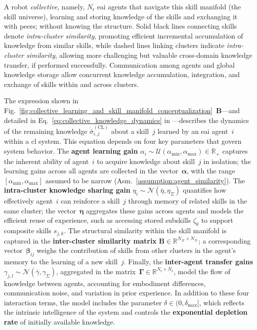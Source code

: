 \documentclass[12pt]{article}
\renewcommand{\emph}[1]{\textit{#1}}
\begin{document}
A robot \emph{collective}, namely, $N_\mathrm{r}$ \ac{eai} agents that navigate this skill manifold (the skill universe), learning and storing knowledge of the skills and exchanging it with peers; without knowing the structure. Solid black lines connecting skills denote \textit{intra-cluster similarity}, promoting efficient incremental accumulation of knowledge from similar skills, while dashed lines linking clusters indicate \textit{intra-cluster similarity}, allowing more challenging but valuable cross-domain knowledge transfer, if performed successfully. Communication among agents and global knowledge storage allow concurrent knowledge accumulation, integration, and exchange of skills within and across clusters. 

The expression shown in Fig.~\ref{fig:collective_learning_and_skill_manifold_conceptualization}~\textbf{B}---and detailed in Eq.~\eqref{eq:collective_knowledge_dynamics} in ---describes the dynamics of the remaining knowledge $\dot{\bar{\sigma}}^{(\mathrm{CL})}_{i,j}$ about a skill~$j$ learned by an \ac{eai} agent~$i$ within a \ac{cl} system. This equation depends on four key parameters that govern system behavior. The \textbf{agent learning gain} $\alpha_i \sim \mathcal{U}(\alpha_{\text{min}},\alpha_{\text{max}}) \in \mathbb{R}_+$ captures the inherent ability of agent~$i$ to acquire knowledge about skill~$j$ in isolation; the learning gains across all agents are collected in the vector~$\bm{\alpha}$, with the range $[\alpha_{\text{min}}, \alpha_{\text{max}}]$ assumed to be narrow (Asm.~\ref{assumption:agent_similarity}). The \textbf{intra-cluster knowledge sharing gain} $\eta_i \sim \mathcal{N}(\bar{\eta},\eta_{\Sigma})$ quantifies how effectively agent~$i$ can reinforce a skill~$j$ through memory of related skills in the same cluster; the vector~$\bm{\eta}$ aggregates these gains across agents and models the efficient reuse of experience, such as accessing stored subskills $\zeta_k$ to support composite skills $s_{j,k}$. The structural similarity within the skill manifold is captured in the \textbf{inter-cluster similarity matrix} $\bm{B} \in \mathbb{R}^{N_\mathcal{K} \times N_\mathcal{K}}$; a corresponding vector~$\bm{\beta}_{ij}$ weighs the contribution of skills from other clusters in the agent’s memory to the learning of a new skill~$j$. Finally, the \textbf{inter-agent transfer gains} $\gamma_{j,l} \sim \mathcal{N}(\bar{\gamma},\gamma_\Sigma)$, aggregated in the matrix~$\bm{\Gamma} \in \mathbb{R}^{N_\mathrm{r} \times N_\mathrm{r}}$, model the flow of knowledge between agents, accounting for embodiment differences, communication noise, and variation in prior experience. In addition to these four interaction terms, the model includes the parameter $\delta \in (0,\delta_{\text{max}}]$, which reflects the intrinsic intelligence of the system and controls the \textbf{exponential depletion rate} of initially available knowledge.
\end{document}
